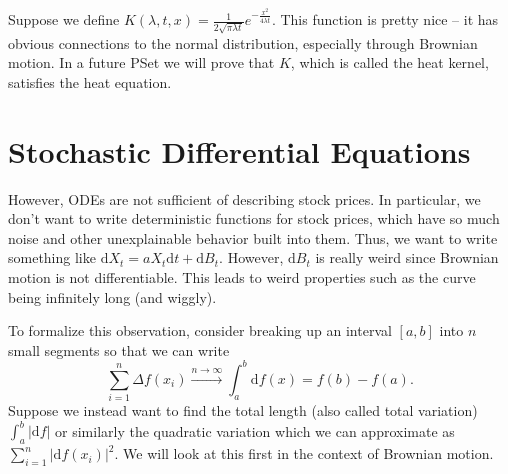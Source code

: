 Suppose we define $K(\lambda,t,x) = \frac{1}{2\sqrt{\pi\lambda t}} e^{-\frac{x^2}{4\lambda t}}$. This function is pretty nice -- it has obvious connections to the normal distribution, especially through Brownian motion. In a future PSet we will prove that $K$, which is called the heat kernel, satisfies the heat equation.

\section{Stochastic Differential Equations}
However, ODEs are not sufficient of describing stock prices. In particular, we don't want to write deterministic functions for stock prices, which have so much noise and other unexplainable behavior built into them. Thus, we want to write something like $\mathrm dX_t = aX_t\mathrm dt + \mathrm dB_t.$ However, $\mathrm dB_t$ is really weird since Brownian motion is not differentiable. This leads to weird properties such as the curve being infinitely long (and wiggly).

To formalize this observation, consider breaking up an interval $[a,b]$ into $n$ small segments so that we can write $$ \sum_{i=1}^n \Delta f(x_i) \overset{n\to\infty}{\longrightarrow} \int_a^b \mathrm df(x) = f(b) - f(a). $$ Suppose we instead want to find the total length (also called total variation) $\int_a^b |\mathrm df|$ or similarly the quadratic variation which we can approximate as $\sum_{i=1}^n \left\lvert\mathrm df(x_i)\right\rvert^2$. We will look at this first in the context of Brownian motion.

